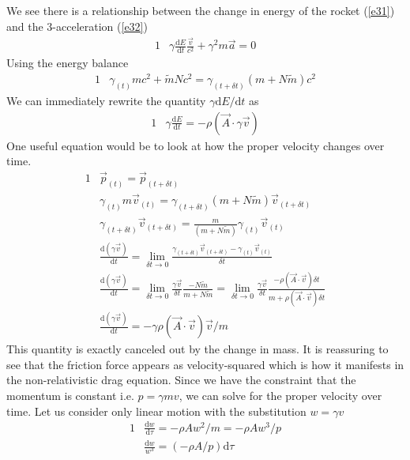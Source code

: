 \documentclass[]{article}
\numberwithin{equation}{subsection}
\begin{document}
We see there is a relationship between the change in energy of the rocket (\ref{e31}) and the 3-acceleration (\ref{e32})
\begin{alignat}{1}
	\label{e33}	&\gamma\frac{\mathrm{d}E}{\mathrm{d}t}\frac{\vec{v}}{c^{2}}+\gamma^{2}m\vec{a}=0
\end{alignat}
Using the energy balance  
\begin{alignat}{1}
	\label{e34}	&\gamma_{(t)}mc^{2}+\tilde{m}Nc^{2}=\gamma_{(t+\delta t)}(m+N\tilde{m})c^{2}
\end{alignat}
We can immediately rewrite the quantity $\gamma\mathrm{d}E/\mathrm{d}t$ as
\begin{alignat}{1}
	\label{e35}	&\gamma\frac{\mathrm{d}E}{\mathrm{d}t}=-\rho(\vec{A}\cdot\gamma\vec{v})
\end{alignat}
One useful equation would be to look at how the proper velocity changes over time.
\begin{alignat}{1}
	\label{e36}	&\vec{p}_{(t)}=\vec{p}_{(t+\delta t)}\\
	\label{e37}	&\gamma_{(t)}m\vec{v}_{(t)}=\gamma_{(t+\delta t)}(m+N\tilde{m})\vec{v}_{(t+\delta t)}\\
	\label{e38}	&\gamma_{(t+\delta t)}\vec{v}_{(t+\delta t)}=\frac{m}{(m+N\tilde{m})}\gamma_{(t)}\vec{v}_{(t)}\\
	\label{e39}	&\frac{\mathrm{d}(\gamma\vec{v})}{\mathrm{d}t}=\lim_{\delta t\to 0}\frac{\gamma_{(t+\delta t)}\vec{v}_{(t+\delta t)}-\gamma_{(t)}\vec{v}_{(t)}}{\delta t}\\
	\label{e40}	&\frac{\mathrm{d}(\gamma\vec{v})}{\mathrm{d}t}=\lim_{\delta t\to 0}\frac{\gamma\vec{v}}{\delta t}\frac{-N\tilde{m}}{m+N\tilde{m}}=\lim_{\delta t\to 0}\frac{\gamma\vec{v}}{\delta t}\frac{-\rho(\vec{A}\cdot\vec{v})\delta t}{m+\rho(\vec{A}\cdot\vec{v})\delta t}\\
	\label{e41}	&\frac{\mathrm{d}(\gamma\vec{v})}{\mathrm{d}t}=-\gamma\rho(\vec{A}\cdot\vec{v})\vec{v}/m
\end{alignat}
This quantity is exactly canceled out by the change in mass. It is reassuring to see that the friction force appears as velocity-squared which is how it manifests in the non-relativistic drag equation. Since we have the constraint that the momentum is constant i.e. $p=\gamma m v$, we can solve for the proper velocity over time. Let us consider only linear motion with the substitution $w=\gamma v$
\begin{alignat}{1}
	\label{e42}	&\frac{\mathrm{d}w}{\mathrm{d}\tau}=-\rho Aw^{2}/m=-\rho Aw^{3}/p\\
	\label{e43}	&\frac{\mathrm{d}w}{w^{3}}=(-\rho A/p)\mathrm{d}\tau
\end{alignat}
\end{document}
